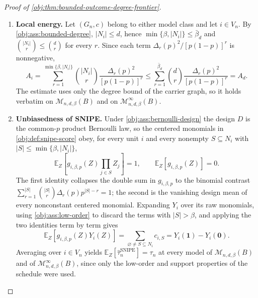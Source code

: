 \documentclass[11pt]{article}
\begin{document}
\begin{proof}[Proof of \cref{obj:thm:bounded-outcome-degree-frontier}]
\begin{enumerate}
Now let \(B>0\) and \(d\ge 1\).  Pick a unit \(i_0\in V_n\) (possible since
\(n\ge1\)), let \(G^{0}\) consist of the single loop \(i_0\to i_0\), and set
\[
c^{0}_{i_0,\varnothing}:=B,
\qquad
c^{0}_{i_0,\{i_0\}}:=-2B,
\]
with all other coefficients zero.  Then \(N_{i_0}=\{i_0\}\) and \(N_i=\varnothing\)
for \(i\ne i_0\), so both degrees in \cref{obj:ass:bounded-degree} are at most
\(1\le d\), and the only nonzero coefficients are indexed by sets of cardinality
at most \(1\le\beta\).  The induced outcomes are
\[
Y_{i_0}(z)=B-2Bz_{i_0}\in\{B,-B\},
\qquad
Y_i(z)=0\quad(i\ne i_0),
\]
so \((G^{0},c^{0})\in\mathcal M_{n,d,\beta}^{\infty}(B)\).  Its coefficient mass
at \(i_0\) is
\[
\sum_{S\subseteq N_{i_0}}|c^{0}_{i_0,S}|=B+2B=3B>B,
\]
so no member of \(\mathcal M_{n,d,\beta}(B)\) has graph \(G^{0}\) and schedule
\(c^{0}\), and the containment is strict.

\item \textbf{Local energy.}
Let \((G_n,c)\) belong to either model class and let \(i\in V_n\).  By
\cref{obj:ass:bounded-degree}, \(|N_i|\le d\), hence
\(\min\{\beta,|N_i|\}\le\bar\beta_d\) and \(\binom{|N_i|}{r}\le\binom dr\) for
every \(r\).  Since each term \(\Delta_r(p)^2/[p(1-p)]^r\) is nonnegative,
\[
A_i
=
\sum_{r=1}^{\min\{\beta,|N_i|\}}\binom{|N_i|}{r}\frac{\Delta_r(p)^2}{[p(1-p)]^r}
\le
\sum_{r=1}^{\bar\beta_d}\binom{d}{r}\frac{\Delta_r(p)^2}{[p(1-p)]^r}
=A_d .
\]
The estimate uses only the degree bound of the carrier graph, so it holds
verbatim on \(\mathcal M_{n,d,\beta}(B)\) and on
\(\mathcal M_{n,d,\beta}^{\infty}(B)\).

\item \textbf{Unbiasedness of SNIPE.}
Under \cref{obj:ass:bernoulli-design} the design \(D\) is the common-\(p\)
product Bernoulli law, so the centered monomials in
\cref{obj:def:snipe-score} obey, for every unit \(i\) and every nonempty
\(S\subseteq N_i\) with \(|S|\le\min\{\beta,|N_i|\}\),
\[
\mathbb E_Z\!\left[g_{i,\beta,p}(Z)\prod_{j\in S}Z_j\right]=1,
\qquad
\mathbb E_Z\!\left[g_{i,\beta,p}(Z)\right]=0 .
\]
The first identity collapses the double sum in \(g_{i,\beta,p}\) to the binomial
contrast \(\sum_{r=1}^{|S|}\binom{|S|}{r}\Delta_r(p)p^{|S|-r}=1\); the second is
the vanishing design mean of every nonconstant centered monomial.  Expanding
\(Y_i\) over its raw monomials, using \cref{obj:ass:low-order} to discard the
terms with \(|S|>\beta\), and applying the two identities term by term gives
\[
\mathbb E_Z\!\left[g_{i,\beta,p}(Z)Y_i(Z)\right]
=
\sum_{\varnothing\ne S\subseteq N_i}c_{i,S}
=
Y_i(\mathbf 1)-Y_i(\mathbf 0).
\]
Averaging over \(i\in V_n\) yields
\(\mathbb E_Z[\widehat\tau_n^{\mathrm{SNIPE}}]=\tau_n\) at every model of
\(\mathcal M_{n,d,\beta}(B)\) and of \(\mathcal M_{n,d,\beta}^{\infty}(B)\), since
only the low-order and support properties of the schedule were used.


\end{enumerate}
\end{proof}
\end{document}

